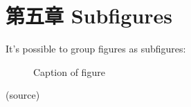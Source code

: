 \documentclass[]{article}
\begin{document}
\hypertarget{sec:ux7b2cux4e94ux7ae0-subfigures}{%
\section{第五章 Subfigures}\label{sec:ux7b2cux4e94ux7ae0-subfigures}}

It's possible to group figures as subfigures:

\begin{figure}
\centering



\caption{Caption of figure}

\label{fig:subfigures}

\end{figure}

(source)
\end{document}
